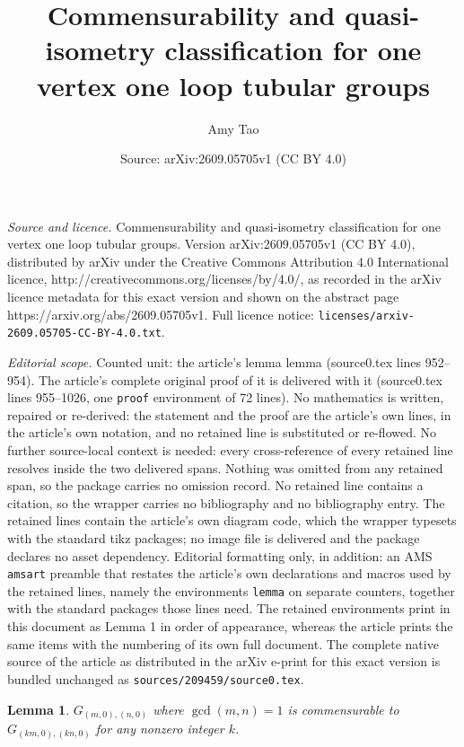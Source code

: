 \documentclass[10pt,a4paper]{amsart}
\title{Commensurability and quasi-isometry classification for one vertex one loop tubular groups}
\author{Amy Tao}
\date{Source: arXiv:2609.05705v1 (CC BY 4.0)}
\newtheorem{lemma}{Lemma}
\begin{document}
\maketitle

\noindent\emph{Source and licence.} Commensurability and quasi-isometry classification for one vertex one loop tubular groups. Version arXiv:2609.05705v1 (CC BY 4.0), distributed by arXiv under the Creative Commons Attribution 4.0 International licence, http://creativecommons.org/licenses/by/4.0/, as recorded in the arXiv licence metadata for this exact version and shown on the abstract page https://arxiv.org/abs/2609.05705v1. Full licence notice: \texttt{licenses/arxiv-2609.05705-CC-BY-4.0.txt}.\par\smallskip

\noindent\textit{Editorial scope.} Counted unit: the article's lemma lemma (source0.tex lines 952--954). The article's complete original proof of it is delivered with it (source0.tex lines 955--1026, one \texttt{proof} environment of 72 lines). No mathematics is written, repaired or re-derived: the statement and the proof are the article's own lines, in the article's own notation, and no retained line is substituted or re-flowed.  No further source-local context is needed: every cross-reference of every retained line resolves inside the two delivered spans.  Nothing was omitted from any retained span, so the package carries no omission record.  No retained line contains a citation, so the wrapper carries no bibliography and no bibliography entry.  The retained lines contain the article's own diagram code, which the wrapper typesets with the standard tikz packages; no image file is delivered and the package declares no asset dependency.  Editorial formatting only, in addition: an AMS \texttt{amsart} preamble that restates the article's own declarations and macros used by the retained lines, namely the environments \texttt{lemma} on separate counters, together with the standard packages those lines need.  The retained environments print in this document as Lemma 1 in order of appearance, whereas the article prints the same items with the numbering of its own full document.  The complete native source of the article as distributed in the arXiv e-print for this exact version is bundled unchanged as \texttt{sources/209459/source0.tex}.
\begin{lemma}
    $G_{(m,0),(n,0)}$ where $\gcd(m,n)=1$ is commensurable to $G_{(km,0),(kn,0)}$ for any nonzero integer $k$. 
\end{lemma}
\end{document}
